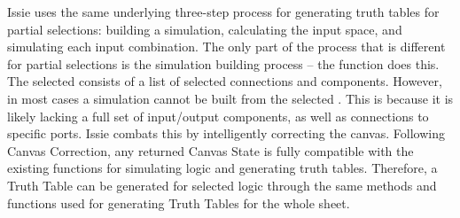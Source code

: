 
Issie uses the same underlying three-step process for generating truth tables for partial selections: building a simulation, calculating the input space, and simulating each input combination. The only part of the process that is different for partial selections is the simulation building process -- the function  does this.
The selected  consists of a list of selected connections and components. However, in most cases a simulation cannot be built from the selected . This is because it is likely lacking a full set of input/output components, as well as connections to specific ports. Issie combats this by intelligently correcting the canvas. Following Canvas Correction, any returned Canvas State is fully compatible with the existing functions for simulating logic and generating truth tables. Therefore, a Truth Table can be generated for selected logic through the same methods and functions used for generating Truth Tables for the whole sheet.

